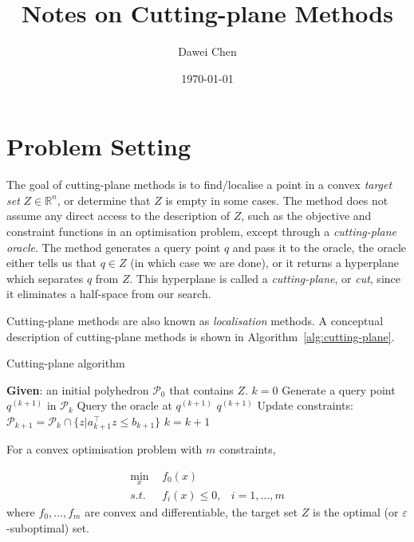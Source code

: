 \documentclass[9pt]{extarticle}
\title{Notes on Cutting-plane Methods}
\author{Dawei Chen}
\date{\today}
\begin{document}
\maketitle

\section{Problem Setting}
\label{sec:problem}

The goal of cutting-plane methods is to find/localise a point in a convex \textit{target set} $Z \in \mathbb{R}^n$,
or determine that $Z$ is empty in some cases. 
The method does not assume any direct access to the description of $Z$,
such as the objective and constraint functions in an optimisation problem, except through a \textit{cutting-plane oracle}.
The method generates a query point $q$ and pass it to the oracle, 
the oracle either tells us that $q \in Z$ (in which case we are done), or it returns a hyperplane which separates $q$ from $Z$.
This hyperplane is called a \textit{cutting-plane}, or \textit{cut}, since it eliminates a half-space from our search.

Cutting-plane methods are also known as \textit{localisation} methods. 
A conceptual description of cutting-plane methods is shown in Algorithm~\ref{alg:cutting-plane}.


\begin{algorithm}[htbp]
\caption{Cutting-plane algorithm}
\label{alg:cutting-plane}
\begin{algorithmic}[1]
\STATE \textbf{Given}: an initial polyhedron $\mathcal{P}_0$ that contains $Z$.
\STATE $k = 0$
\REPEAT
    \STATE Generate a query point $q^{(k+1)}$ in $\mathcal{P}_k$
    \STATE Query the oracle at $q^{(k+1)}$
        \RETURN $q^{(k+1)}$
        \STATE Update constraints: $\mathcal{P}_{k+1} = \mathcal{P}_k \cap \{z | a_{k+1}^\top z \le b_{k+1} \}$
    \ENDIF
    \STATE $k = k + 1$
\end{algorithmic}
\end{algorithm}


\noindent
For a convex optimisation problem with $m$ constraints,

\begin{equation}
\label{eq:cvxprob}
\begin{aligned}
\min_{x} ~& f_0(x)        & \\
s.t.~~   ~& f_i(x) \le 0, & i = 1, \dots, m
\end{aligned} 
\end{equation}
where $f_0, \dots, f_m$ are convex and differentiable, the target set $Z$ is the optimal (or $\varepsilon$-suboptimal) set.
\end{document}
